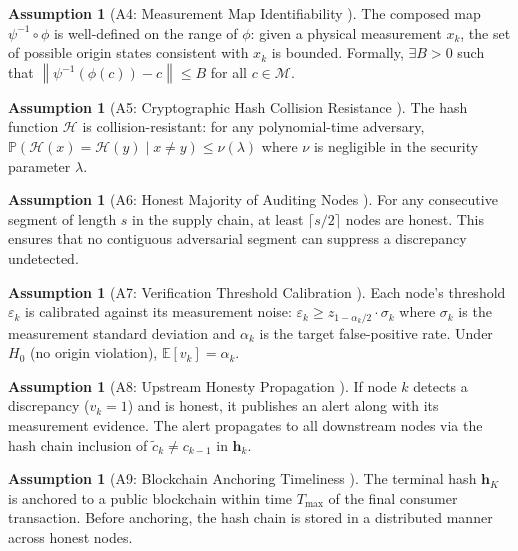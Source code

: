 \documentclass[11pt,a4paper]{article}
\theoremstyle{definition}
\newtheorem{assumption}[theorem]{Assumption}
\theoremstyle{remark}
\newcommand{\E}{\mathbb{E}}
\newcommand{\Pbb}{\mathbb{P}}
\newcommand{\norm}[1]{\left\lVert#1\right\rVert}
\newcommand{\claimSpace}{\mathcal{M}}
\newcommand{\hashFunc}{\mathcal{H}}
\newcommand{\hashChain}{\mathbf{h}}
\begin{document}
\begin{assumption}[A4: Measurement Map Identifiability ]
\label{ass:A4}
The composed map $\psi^{-1} \circ \phi$ is well-defined on the range of $\phi$: given a physical measurement $x_k$, the set of possible origin states consistent with $x_k$ is bounded. Formally, $\exists B > 0$ such that $\norm{\psi^{-1}(\phi(c)) - c} \leq B$ for all $c \in \claimSpace$.
\end{assumption}

\begin{assumption}[A5: Cryptographic Hash Collision Resistance ]
\label{ass:A5}
The hash function $\hashFunc$ is collision-resistant: for any polynomial-time adversary, $\Pbb(\hashFunc(x) = \hashFunc(y) \mid x \neq y) \leq \nu(\lambda)$ where $\nu$ is negligible in the security parameter $\lambda$.
\end{assumption}

\begin{assumption}[A6: Honest Majority of Auditing Nodes ]
\label{ass:A6}
For any consecutive segment of length $s$ in the supply chain, at least $\lceil s/2 \rceil$ nodes are honest. This ensures that no contiguous adversarial segment can suppress a discrepancy undetected.
\end{assumption}

\begin{assumption}[A7: Verification Threshold Calibration ]
\label{ass:A7}
Each node's threshold $\varepsilon_k$ is calibrated against its measurement noise: $\varepsilon_k \geq z_{1-\alpha_k/2} \cdot \sigma_k$ where $\sigma_k$ is the measurement standard deviation and $\alpha_k$ is the target false-positive rate. Under $H_0$ (no origin violation), $\E[v_k] = \alpha_k$.
\end{assumption}

\begin{assumption}[A8: Upstream Honesty Propagation ]
\label{ass:A8}
If node $k$ detects a discrepancy ($v_k = 1$) and is honest, it publishes an alert along with its measurement evidence. The alert propagates to all downstream nodes via the hash chain inclusion of $\tilde{c}_k \neq c_{k-1}$ in $\hashChain_k$.
\end{assumption}

\begin{assumption}[A9: Blockchain Anchoring Timeliness ]
\label{ass:A9}
The terminal hash $\hashChain_K$ is anchored to a public blockchain within time $T_{\max}$ of the final consumer transaction. Before anchoring, the hash chain is stored in a distributed manner across honest nodes.
\end{assumption}
\end{document}
